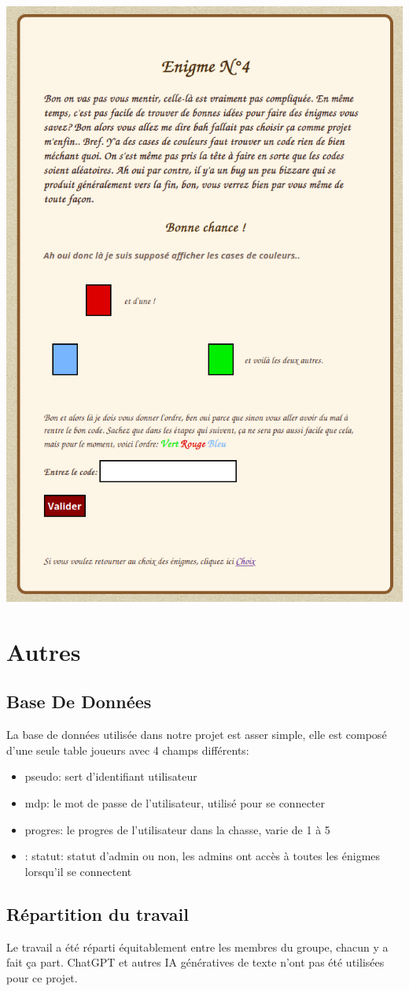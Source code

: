 \documentclass[12pt,a4paper]{article}
\begin{document}
\includegraphics[scale=0.4]{enigme4.png}

\newpage
\section{Autres}
\subsection{Base De Données}
La base de données utilisée dans notre projet est asser simple, elle est composé d'une seule table joueurs avec 4 champs différents:
\begin{itemize}
\item pseudo: sert d'identifiant utilisateur
\item mdp: le mot de passe de l'utilisateur, utilisé pour se connecter
\item progres: le progres de l'utilisateur dans la chasse, varie de 1 à 5
\item: statut: statut d'admin ou non, les admins ont accès à toutes les énigmes lorsqu'il se connectent
\end{itemize}

\subsection{Répartition du travail}
Le travail a été réparti équitablement entre les membres du groupe, chacun y a fait ça part. ChatGPT et autres IA génératives de texte n'ont pas été utilisées pour ce projet.
  
\end{document}
